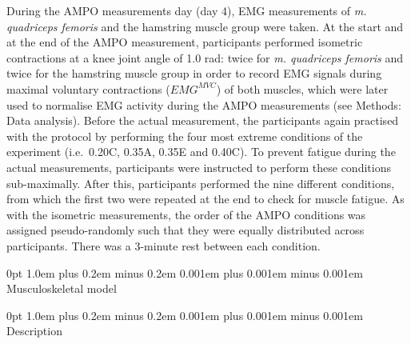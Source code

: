 \documentclass[
  11pt,
  a4paper]{article}
\makeatletter
\renewcommand{\subsection}{%
  \@startsection{subsection}{2}
    {0pt} 					%
    {1.0em plus 0.2em minus 0.2em} 	%
    {0.001em plus 0.001em minus 0.001em}    	%
    {\large\bfseries\sffamily}%
}
\renewcommand{\subsubsection}{%
  \@startsection{subsubsection}{3}
    {0pt} 					%
    {1.0em plus 0.2em minus 0.2em} 	%
    {0.001em plus 0.001em minus 0.001em}    	%
    {\normalsize\bfseries\sffamily}%
}
\makeatother
\begin{document}
During the AMPO measurements day (day 4), EMG measurements of \emph{m.
quadriceps femoris} and the hamstring muscle group were taken. At the
start and at the end of the AMPO measurement, participants performed
isometric contractions at a knee joint angle of 1.0 rad: twice for
\emph{m. quadriceps femoris} and twice for the hamstring muscle group in
order to record EMG signals during maximal voluntary contractions
(\(EMG^{MVC}\)) of both muscles, which were later used to normalise EMG
activity during the AMPO measurements (see Methods: Data analysis).
Before the actual measurement, the participants again practised with the
protocol by performing the four most extreme conditions of the
experiment (i.e.~0.20C, 0.35A, 0.35E and 0.40C). To prevent fatigue
during the actual measurements, participants were instructed to perform
these conditions sub-maximally. After this, participants performed the
nine different conditions, from which the first two were repeated at the
end to check for muscle fatigue. As with the isometric measurements, the
order of the AMPO conditions was assigned pseudo-randomly such that they
were equally distributed across participants. There was a 3-minute rest
between each condition.

\subsection{Musculoskeletal model}\label{sec-m-musmodel}

\subsubsection{Description}\label{description}
\end{document}
